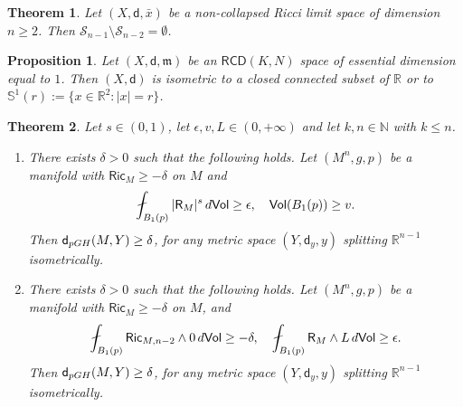 \documentclass[10pt,a4paper]{amsart}
\newtheorem{thm}{Theorem}
\newtheorem{proposition}{Proposition}
\newcommand{\R}{\mathsf{R}}
\newcommand{\RCD}{\mathsf{RCD}}
\newcommand{\Ric}{\mathsf{Ric}}
\newcommand{\bb}[1]{\mathbb{#1}}
\newcommand{\de}{{\rm d}}
\newcommand{\m}{\mathfrak{m}}
\newcommand{\sd}{\mathsf{d}}
\newcommand{\ssf}[1]{\mathsf{#1}}
\begin{document}
\begin{thm} \label{T2}
    Let $(X, \sd, \bar{x})$ be a non-collapsed Ricci limit space of dimension $n \geq 2$. Then $\mathcal{S}_{n-1} \setminus \mathcal{S}_{n-2} = \emptyset$.
\end{thm}

\begin{proposition} \label{P1}
    Let $(X,\sd,\m)$ be an $\RCD(K,N)$ space of essential dimension equal to $1$. Then $(X, \sd)$ is isometric to a closed connected subset of $\bb{R}$ or to $\mathbb{S}^1(r):=\{x \in \bb{R}^2: |x|=r \}$.
\end{proposition}

\begin{thm} \label{CT2}
    Let $s \in (0,1)$, let $\epsilon,v,L \in (0,+\infty)$ and let $k,n \in \bb{N}$ with $k \leq n$. 
    \begin{enumerate}
        \item \label{Thm4.7-1} There exists $\delta>0$ such that the following holds. Let $(M^n,g,p)$ be a manifold with $\Ric_{M} \geq -\delta$ on $M$ and
    \[
     \fint_{B_1(p)} |\R_{M}|^s \, \de \ssf{Vol}  \geq \epsilon, \quad \ssf{Vol}(B_1(p)) \geq v.
    \] 
    Then $\sd_{\rm{pGH}}(M,Y) \geq \delta$, for any metric space $(Y,\sd_y,y)$  splitting $\bb{R}^{n-1}$ isometrically.
    \item \label{Thm4.7-2}
    There exists $\delta>0$ such that the following holds. Let $(M^n,g,p)$ be a manifold with $\Ric_{M} \geq -\delta$ on $M$, and
    \[
    \fint_{B_1(p)} \ssf{Ric}_{M,n-2} \wedge 0 \, \de \ssf{Vol}  \geq -\delta, \quad 
     \fint_{B_1(p)} \R_{M} \wedge L \, \de \ssf{Vol}  \geq \epsilon.
    \] 
     Then $\sd_{\rm{pGH}}(M,Y) \geq \delta$, for any metric space $(Y,\sd_y,y)$  splitting $\bb{R}^{n-1}$ isometrically.
    \end{enumerate}
\end{thm}
\end{document}
